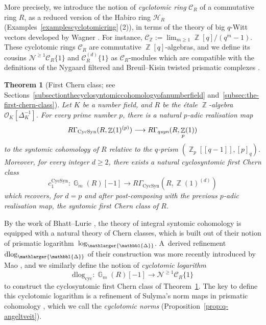 \documentclass[10pt,twoside]{scrarticle}
\newtheorem{theoremintro}{Theorem}
\theoremstyle{definition}
\DeclareMathOperator{\Z}{\mathbb{Z}}
\DeclareMathOperator{\G}{\mathbb{G}}
\newcommand{\nbrrg}{\mathcal{O}_K[\Delta_K^{-1}]}
\newcommand{\CR}{\mathcal{C}_{R}}
\newcommand{\Cyc}{\mathrm{cyc}}
\newcommand{\CycSyn}{\mathrm{CycSyn}}
\renewcommand{\ge}{\geqslant}
\newcommand{\dlog}{\mathrm{dlog}}
\newcommand{\Prism}{{\mathlarger{\mathbbl{\Delta}}}}
\numberwithin{equation}{theorem}
\begin{document}
    More precisely, we introduce the notion of \emph{cyclotomic ring} $\mathcal{C}_R$ of a commutative ring $R$, as a reduced version of the Habiro ring $\mathcal{H}_R$ (Examples~\ref{examplescyclotomicring}\,(2)), in terms of the theory of big $q$\nobreakdash-Witt vectors developed by Wagner \cite{wagner_q-witt_2024}. For instance, $\mathcal{C}_{\Z} := \lim_{m \ge 1} \Z[q]/(q^m-1)$. 
    These cyclotomic rings $\mathcal{C}_R$ are commutative $\Z[q]$-algebras, and we define its cousins $\mathcal{N}^{\ge 1} \mathcal{C}_R \{1\}$ and $\mathcal{C}_R^{(d)}\{1\}$ as $\CR$\nobreakdash-modules which are compatible with the definitions of the Nygaard filtered and Breuil\nobreakdash--Kisin twisted prismatic complexes \cite{bhatt_topological_2019,bhatt_prisms_2022,bhatt_absolute_2022,antieau_prismatic_2023}. 

    \begin{theoremintro}[First Chern class; see Sections~\ref{subsectionthecyclosyntomiccohomologyofanumberfield} and~\ref{subsec:the-first-chern-class}] \label{theoremintrofirstChernclass}
        Let $K$ be a number field, and $R$ be the étale $\Z$-algebra $\nbrrg$. For every prime number $p$, there is a natural \emph{$p$-adic realisation map}
        $$R\Gamma_{\CycSyn}(R,\Z(1)^{(p)}) \longrightarrow R\Gamma_{q\emph{syn}}(R,\Z_p(1))$$
        to the syntomic cohomology of $R$ relative to the $q$-prism $(\Z_p[\![q-1]\!],[p]_q)$. Moreover, for every integer $d \ge 2$, there exists a natural \emph{cyclosyntomic first Chern class}
        $$c_1^{\CycSyn} : \G_m(R)[-1] \longrightarrow R\Gamma_{\CycSyn}(R,\Z(1)^{(d)})$$
        which recovers, for $d=p$ and after post-composing with the previous $p$-adic realisation map, the syntomic first Chern class of $R$.
    \end{theoremintro}

    By the work of Bhatt--Lurie \cite{bhatt_absolute_2022}, the theory of integral syntomic cohomology is equipped with a natural theory of Chern classes, which is built out of their notion of prismatic logarithm~$\log_{\Prism}$. A~derived refinement $\dlog_{\Prism}$ of their construction was more recently introduced by Mao \cite{mao_prismatic_2024}, and we similarly define the notion of \emph{cyclotomic logarithm}
    $$\dlog_{\Cyc} : \G_m(R)[-1] \longrightarrow \mathcal{N}^{\ge 1} \CR\{1\}$$
    to construct the cyclosyntomic first Chern class of Theorem~\ref{theoremintrofirstChernclass}. The key to define this cyclotomic logarithm is a refinement of Sulyma's norm maps in prismatic cohomology \cite{sulyma_prisms_2023,mao_prismatic_2024}, which we call the \emph{cyclotomic norms} (Proposition~\ref{prop:q-angeltveit}). 
    
\end{document}
